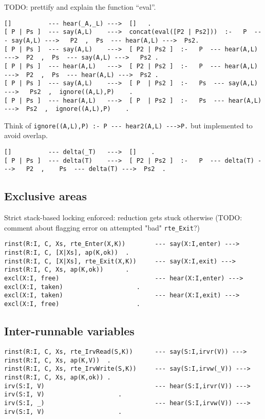 TODO: prettify and explain the function ``eval''.
\begin{verbatim}
[]          --- hear(_A,_L) --->  []   .
[ P | Ps ]  --- say(A,L)    --->  concat(eval([P2 | Ps2]))  :-   P  --- say(A,L) --->   P2  ,  Ps  --- hear(A,L) --->  Ps2.
[ P | Ps ]  --- say(A,L)    --->  [ P2 | Ps2 ]  :-   P  --- hear(A,L) --->  P2  ,  Ps  --- say(A,L) --->   Ps2 .
[ P | Ps ]  --- hear(A,L)   --->  [ P2 | Ps2 ]  :-   P  --- hear(A,L) --->  P2  ,  Ps  --- hear(A,L) --->  Ps2 .
[ P | Ps ]  --- say(A,L)    --->  [ P  | Ps2 ]  :-   Ps  --- say(A,L) --->   Ps2  ,  ignore((A,L),P)    .
[ P | Ps ]  --- hear(A,L)   --->  [ P  | Ps2 ]  :-   Ps  --- hear(A,L) --->  Ps2  ,  ignore((A,L),P)    .
\end{verbatim}
Think of \verb+ignore((A,L),P) :- P --- hear2(A,L) --->P.+ but implemented to avoid overlap.
\begin{verbatim}
[]          --- delta(_T)   --->  []    .
[ P | Ps ]  --- delta(T)    --->  [ P2 | Ps2 ]  :-   P  --- delta(T) --->   P2  ,    Ps  --- delta(T) --->  Ps2  .
\end{verbatim}

\subsection{Exclusive areas}

Strict stack-based locking enforced: reduction gets stuck otherwise
(TODO: comment about flagging error on attempted "bad" \verb+rte_Exit+?)
\begin{verbatim}
rinst(R:I, C, Xs, rte_Enter(X,K))        --- say(X:I,enter) --->     rinst(R:I, C, [X|Xs], ap(K,ok))  .
rinst(R:I, C, [X|Xs], rte_Exit(X,K))     --- say(X:I,exit) --->      rinst(R:I, C, Xs, ap(K,ok))      .
excl(X:I, free)                          --- hear(X:I,enter) --->    excl(X:I, taken)                    .
excl(X:I, taken)                         --- hear(X:I,exit) --->     excl(X:I, free)                     .
\end{verbatim}

\subsection{Inter-runnable variables}

\begin{verbatim}
rinst(R:I, C, Xs, rte_IrvRead(S,K))      --- say(S:I,irvr(V)) --->     rinst(R:I, C, Xs, ap(K,V))  .
rinst(R:I, C, Xs, rte_IrvWrite(S,K))     --- say(S:I,irvw(_V)) --->    rinst(R:I, C, Xs, ap(K,ok)) .
irv(S:I, V)                              --- hear(S:I,irvr(V)) --->    irv(S:I, V)                    .
irv(S:I, _)                              --- hear(S:I,irvw(V)) --->    irv(S:I, V)                    .
\end{verbatim}

